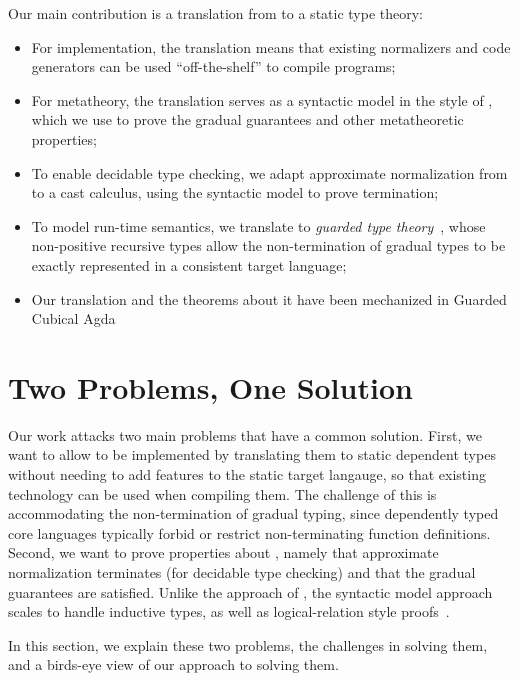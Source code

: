 Our main contribution is a translation from \lang to a static type theory:
\begin{itemize}
          \item For implementation, the translation means that existing normalizers
                and code generators can be used ``off-the-shelf'' to compile \lang programs;
  \item For metatheory, the translation serves as a syntactic model in the style of \citet{10.1145/3018610.3018620}, which we use to prove the gradual guarantees
        and other metatheoretic properties;
  \item To enable decidable type checking, we adapt approximate normalization
        from \citet{Eremondi:2019:ANG:3352468.3341692} to a cast calculus, using the syntactic
        model to prove termination;
  \item To model run-time semantics, we translate to \textit{guarded type theory}~\citep{TODO},
        whose non-positive recursive types allow the non-termination of gradual types to be
        exactly represented in a consistent target language;
  \item  Our translation and the theorems about it have been mechanized in Guarded Cubical Agda~\citep{TODO}
\end{itemize}

\section{Two Problems, One Solution}

Our work attacks two main problems that have a common solution.
First, we want to allow \lang to be implemented
by translating them to static dependent types without needing to add features to the static target langauge,
so that existing technology can be
used when compiling them.
The challenge of this is accommodating the non-termination of gradual typing,
since dependently typed core languages typically forbid or restrict non-terminating function definitions.
Second, we want to prove properties about \lang, namely that approximate normalization
terminates (for decidable type checking) and that the gradual guarantees are satisfied.
Unlike the approach of \citet{Eremondi:2019:ANG:3352468.3341692}, the syntactic model
approach scales to handle inductive types, as well as logical-relation
style proofs~\citep{10.1017/S0956796812000056}.

In this section, we explain these two problems, the challenges in solving
them, and a birds-eye view of our approach to solving them.




